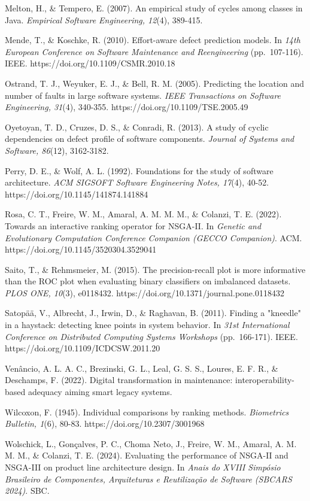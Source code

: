 \documentclass[
  a4paper,
]{article}
\begin{document}
Melton, H., \& Tempero, E. (2007). An empirical study of cycles among classes in Java. \emph{Empirical Software Engineering, 12}(4), 389-415.

Mende, T., \& Koschke, R. (2010). Effort-aware defect prediction models. In \emph{14th European Conference on Software Maintenance and Reengineering} (pp.~107-116). IEEE. https://doi.org/10.1109/CSMR.2010.18

Ostrand, T. J., Weyuker, E. J., \& Bell, R. M. (2005). Predicting the location and number of faults in large software systems. \emph{IEEE Transactions on Software Engineering, 31}(4), 340-355. https://doi.org/10.1109/TSE.2005.49

Oyetoyan, T. D., Cruzes, D. S., \& Conradi, R. (2013). A study of cyclic dependencies on defect profile of software components. \emph{Journal of Systems and Software, 86}(12), 3162-3182.

Perry, D. E., \& Wolf, A. L. (1992). Foundations for the study of software architecture. \emph{ACM SIGSOFT Software Engineering Notes, 17}(4), 40-52. https://doi.org/10.1145/141874.141884

Rosa, C. T., Freire, W. M., Amaral, A. M. M. M., \& Colanzi, T. E. (2022). Towards an interactive ranking operator for NSGA-II. In \emph{Genetic and Evolutionary Computation Conference Companion (GECCO  Companion)}. ACM. https://doi.org/10.1145/3520304.3529041

Saito, T., \& Rehmsmeier, M. (2015). The precision-recall plot is more informative than the ROC plot when evaluating binary classifiers on imbalanced datasets. \emph{PLOS ONE, 10}(3), e0118432. https://doi.org/10.1371/journal.pone.0118432

Satopää, V., Albrecht, J., Irwin, D., \& Raghavan, B. (2011). Finding a "kneedle" in a haystack: detecting knee points in system behavior. In \emph{31st International Conference on Distributed Computing Systems Workshops} (pp.~166-171). IEEE. https://doi.org/10.1109/ICDCSW.2011.20

Venâncio, A. L. A. C., Brezinski, G. L., Leal, G. S. S., Loures, E. F. R., \& Deschamps, F. (2022). Digital transformation in maintenance: interoperability-based adequacy aiming smart legacy systems.

Wilcoxon, F. (1945). Individual comparisons by ranking methods. \emph{Biometrics Bulletin, 1}(6), 80-83. https://doi.org/10.2307/3001968

Wolschick, L., Gonçalves, P. C., Choma Neto, J., Freire, W. M., Amaral, A. M. M. M., \& Colanzi, T. E. (2024). Evaluating the performance of NSGA-II and NSGA-III on product line architecture design. In \emph{Anais do XVIII Simpósio Brasileiro de Componentes, Arquiteturas e Reutilização de Software (SBCARS 2024)}. SBC.
\end{document}
